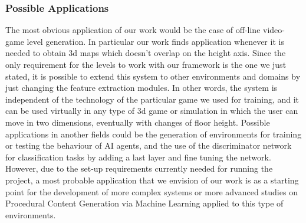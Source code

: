 \subsubsection{Possible Applications}
The most obvious application of our work would be the case of off-line video-game level generation. In particular our work finds application whenever it is needed to obtain 3d maps which doesn't overlap on the height axis. Since the only requirement for the levels to work with our framework is the one we just stated, it is possible to extend this system to other environments and domains by just changing the feature extraction modules. In other words, the system is independent of the technology of the particular game we used for training, and it can be used virtually in any type of 3d game or simulation in which the user can move in two dimensions, eventually with changes of floor height. Possible applications in another fields could be the generation of environments for training or testing the behaviour of AI agents, and the use of the discriminator network for classification tasks by adding a last layer and fine tuning the network. However, due to the set-up requirements currently needed for running the project, a most probable application that we envision of our work is as a starting point for the development of more complex systems or more advanced studies on Procedural Content Generation via Machine Learning applied to this type of environments.

